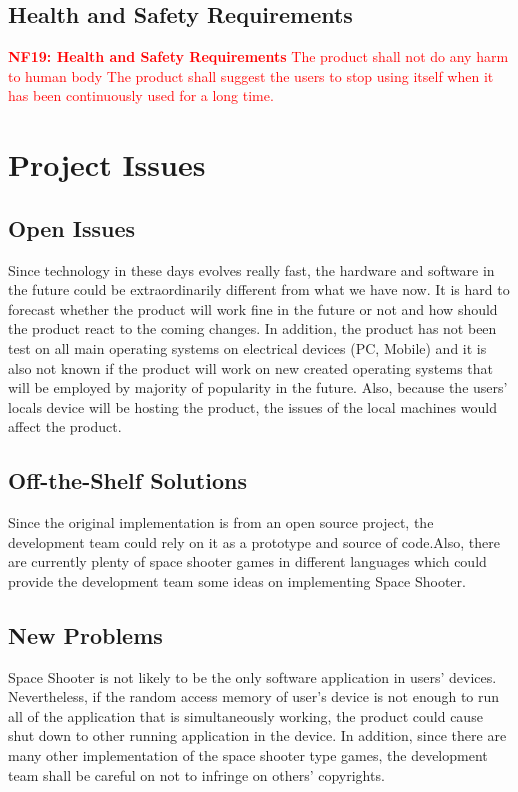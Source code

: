 \documentclass[12pt, titlepage]{article}
\begin{document}
\subsection{Health and Safety Requirements}

\noindent \textcolor{red}{\textbf{NF19: Health and Safety Requirements}
\newline
The product shall not do any harm to human body\newline
The product shall suggest the users to stop using itself when it has been continuously used for a long time.}

\section{Project Issues}

\subsection{Open Issues}
Since technology in these days evolves really fast, the hardware and software in the future could be extraordinarily different from what we have now. It is hard to forecast whether the product will work fine in the future or not and how should the product react to the coming changes. In addition, the product has not been test on all main operating systems on electrical devices (PC, Mobile) and it is also not known if the product will work on new created operating systems that will be employed by majority of popularity in the future. Also, because the users' locals device will be hosting the product, the issues of the local machines would affect the product.  

\subsection{Off-the-Shelf Solutions}
Since the original implementation is from an open source project, the development team could rely on it as a prototype and source of code.\newline Also, there are currently plenty of space shooter games in different languages which could provide the development team some ideas on implementing Space Shooter.

\subsection{New Problems}
Space Shooter is not likely to be the only software application in users' devices. Nevertheless, if the random access memory of user's device is not enough to run all of the application that is simultaneously working, the product could cause shut down to other running application in the device.\newline
In addition, since there are many other implementation of the space shooter type games, the development team shall be careful on not to infringe on others' copyrights.
\end{document}
